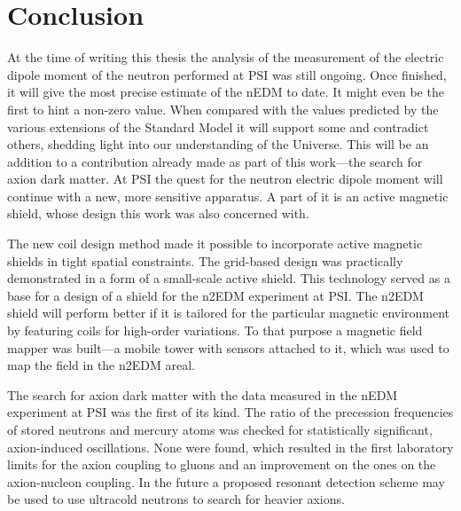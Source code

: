 
\begingroup

\let\clearpage\relax
\let\cleardoublepage\relax
\let\cleardoublepage\relax

\chapter*{Conclusion}
At the time of writing this thesis the analysis of the measurement of the electric dipole moment of the neutron performed at PSI was still ongoing. Once finished, it will give the most precise estimate of the nEDM to date. It might even be the first to hint a non-zero value. When compared with the values predicted by the various extensions of the Standard Model it will support some and contradict others, shedding light into our understanding of the Universe. This will be an addition to a contribution already made as part of this work---the search for axion dark matter. At PSI the quest for the neutron electric dipole moment will continue with a new, more sensitive apparatus. A part of it is an active magnetic shield, whose design this work was also concerned with.

The new coil design method made it possible to incorporate active magnetic shields in tight spatial constraints. The grid-based design was practically demonstrated in a form of a small-scale active shield. This technology served as a base for a design of a shield for the n2EDM experiment at PSI\@. The n2EDM shield will perform better if it is tailored for the particular magnetic environment by featuring coils for high-order variations. To that purpose a magnetic field mapper was built---a mobile tower with sensors attached to it, which was used to map the field in the n2EDM areal.

The search for axion dark matter with the data measured in the nEDM experiment at PSI was the first of its kind. The ratio of the precession frequencies of stored neutrons and mercury atoms was checked for statistically significant, axion-induced oscillations. None were found, which resulted in the first laboratory limits for the axion coupling to gluons and an improvement on the ones on the axion-nucleon coupling. In the future a proposed resonant detection scheme may be used to use ultracold neutrons to search for heavier axions.

\endgroup